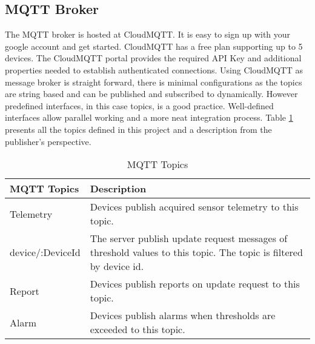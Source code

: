 \subsection{MQTT Broker}

The MQTT broker is hosted at CloudMQTT. It is easy to sign up with your google account and get started. CloudMQTT has a free plan supporting up to 5 devices. The CloudMQTT portal provides the required API Key and additional properties needed to establish authenticated connections. Using CloudMQTT as message broker is straight forward, there is minimal configurations as the topics are string based and can be published and subscribed to dynamically. However predefined interfaces, in this case topics, is a good practice. Well-defined interfaces allow parallel working and a more neat integration process. Table \ref{tbl:topics} presents all the topics defined in this project and a description from the publisher's perspective.

\begin{table}[H]
    \centering
    \begin{tabular}{|l|p{10cm}|}
    \hline
    \textbf{MQTT Topics}    & \textbf{Description} \\ \hline
    Telemetry & Devices publish acquired sensor telemetry to this topic. \\ \hline
    device/:DeviceId & The server publish update request messages of threshold values to this topic. The topic is filtered by device id. \\ \hline
    Report & Devices publish reports on update request to this topic. \\ \hline
    Alarm & Devices publish alarms when thresholds are exceeded to this topic. \\ \hline
    
    \end{tabular}
    \caption{MQTT Topics}
    \label{tbl:topics}
\end{table}
